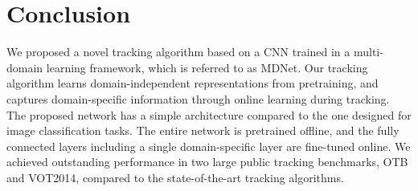 \documentclass[10pt,twocolumn,letterpaper]{article}
\begin{document}
\section{Conclusion}
\label{sec:conclusion}
We proposed a novel tracking algorithm based on a CNN trained in a multi-domain learning framework, which is referred to as MDNet.
Our tracking algorithm learns domain-independent representations from pretraining, and captures domain-specific information through online learning during tracking.
The proposed network has a simple architecture compared to the one designed for image classification tasks.
The entire network is pretrained offline, and the fully connected layers including a single domain-specific layer are fine-tuned online.
We achieved outstanding performance in two large public tracking benchmarks, OTB and VOT2014, compared to the state-of-the-art tracking algorithms.

{\small


}
\end{document}
